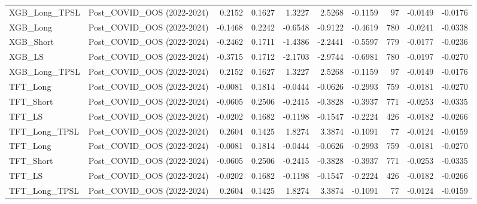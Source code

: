 \begin{tabular}{llrrrrrrrr}
\cline{1-10}
XGB\_Long\_TPSL & Post\_COVID\_OOS (2022-2024) & 0.2152 & 0.1627 & 1.3227 & 2.5268 & -0.1159 & 97 & -0.0149 & -0.0176 \\
\cline{1-10}
XGB\_Long & Post\_COVID\_OOS (2022-2024) & -0.1468 & 0.2242 & -0.6548 & -0.9122 & -0.4619 & 780 & -0.0241 & -0.0338 \\
\cline{1-10}
XGB\_Short & Post\_COVID\_OOS (2022-2024) & -0.2462 & 0.1711 & -1.4386 & -2.2441 & -0.5597 & 779 & -0.0177 & -0.0236 \\
\cline{1-10}
XGB\_LS & Post\_COVID\_OOS (2022-2024) & -0.3715 & 0.1712 & -2.1703 & -2.9744 & -0.6981 & 780 & -0.0197 & -0.0270 \\
\cline{1-10}
XGB\_Long\_TPSL & Post\_COVID\_OOS (2022-2024) & 0.2152 & 0.1627 & 1.3227 & 2.5268 & -0.1159 & 97 & -0.0149 & -0.0176 \\
\cline{1-10}
TFT\_Long & Post\_COVID\_OOS (2022-2024) & -0.0081 & 0.1814 & -0.0444 & -0.0626 & -0.2993 & 759 & -0.0181 & -0.0270 \\
\cline{1-10}
TFT\_Short & Post\_COVID\_OOS (2022-2024) & -0.0605 & 0.2506 & -0.2415 & -0.3828 & -0.3937 & 771 & -0.0253 & -0.0335 \\
\cline{1-10}
TFT\_LS & Post\_COVID\_OOS (2022-2024) & -0.0202 & 0.1682 & -0.1198 & -0.1547 & -0.2224 & 426 & -0.0182 & -0.0266 \\
\cline{1-10}
TFT\_Long\_TPSL & Post\_COVID\_OOS (2022-2024) & 0.2604 & 0.1425 & 1.8274 & 3.3874 & -0.1091 & 77 & -0.0124 & -0.0159 \\
\cline{1-10}
TFT\_Long & Post\_COVID\_OOS (2022-2024) & -0.0081 & 0.1814 & -0.0444 & -0.0626 & -0.2993 & 759 & -0.0181 & -0.0270 \\
\cline{1-10}
TFT\_Short & Post\_COVID\_OOS (2022-2024) & -0.0605 & 0.2506 & -0.2415 & -0.3828 & -0.3937 & 771 & -0.0253 & -0.0335 \\
\cline{1-10}
TFT\_LS & Post\_COVID\_OOS (2022-2024) & -0.0202 & 0.1682 & -0.1198 & -0.1547 & -0.2224 & 426 & -0.0182 & -0.0266 \\
\cline{1-10}
TFT\_Long\_TPSL & Post\_COVID\_OOS (2022-2024) & 0.2604 & 0.1425 & 1.8274 & 3.3874 & -0.1091 & 77 & -0.0124 & -0.0159 \\
\cline{1-10}
\bottomrule
\end{tabular}
